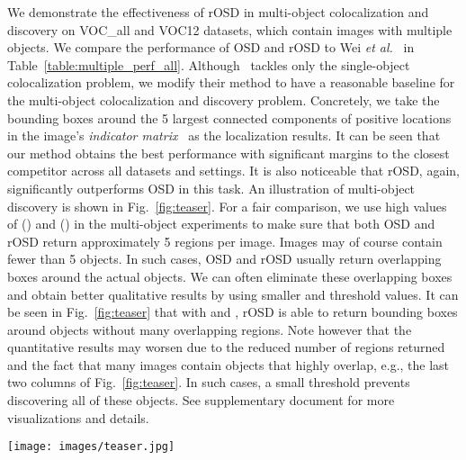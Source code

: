 \documentclass[runningheads]{llncs}
\begin{document}
We demonstrate the effectiveness of rOSD in multi-object colocalization and discovery on VOC\_all and VOC12 datasets, which contain images with multiple objects.  We compare the performance of OSD and rOSD to Wei {\em et al.}~\cite{Wei2019ddtplus} in Table~\ref{table:multiple_perf_all}. Although~\cite{Wei2019ddtplus} tackles only the single-object colocalization problem, we modify their method to have a reasonable baseline for the multi-object colocalization and discovery problem. Concretely, we take the bounding boxes around the 5 largest connected components of positive locations in the image's \textit{indicator matrix}~\cite{Wei2019ddtplus} as the localization results. It can be seen that our method obtains the best performance with significant margins to the closest competitor across all datasets and settings. It is also noticeable that rOSD, again, significantly outperforms OSD in this task. 
An illustration of multi-object discovery is shown in Fig.~\ref{fig:teaser}. For a fair comparison, we use high values of  () and  () in the multi-object experiments to make sure that both OSD and rOSD return approximately 5 regions per image. Images may of course contain fewer than 5 objects. In such cases, OSD and rOSD usually return overlapping boxes around the actual objects. We can often eliminate these overlapping boxes and obtain better qualitative results by using smaller  and  threshold values. It can be seen in Fig.~\ref{fig:teaser} that with  and , rOSD is able to return bounding boxes around objects without many overlapping regions. Note however that the quantitative results may worsen due to the reduced number of regions returned and the fact that many images contain objects that highly overlap, e.g., the last two columns of Fig.~\ref{fig:teaser}. In such cases, a small  threshold prevents discovering all of these objects. See supplementary document for more visualizations and details.
\begin{figure*}[h]
\centering
\parbox[t][][t]{0.85\linewidth}{
\texttt{[image: images/teaser.jpg]}
}
\vspace{-5pt}
\caption{\small Qualitative multi-object discovery results obtained with rOSD. White boxes are ground truth objects and red ones are our predictions. Original images are in the first row. Results with  and  are in the second row. Results with  and  are in the third row.}
\label{fig:teaser}
\end{figure*} 
\end{document}
